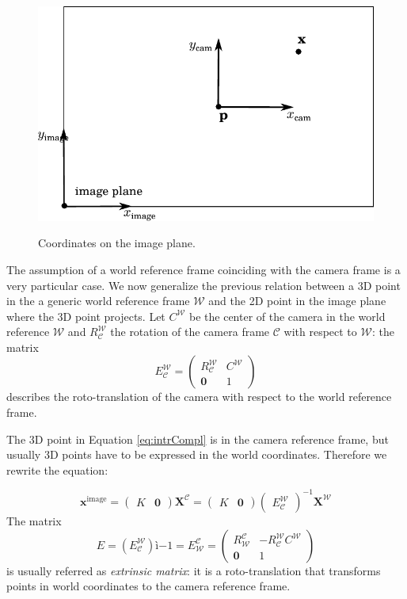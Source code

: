 \begin{figure}[t]
  \includegraphics[width=0.8\columnwidth]{./img/ch-camera/camera02}\\
 \caption{Coordinates on the image plane.}
 \label{fig:centercamera}
\end{figure}
The assumption of a world reference frame coinciding with the camera frame is a very particular case. We now generalize the previous relation between a 3D point in the a generic world reference frame $\mathcal{W}$ and the 2D point in the image plane where the 3D point projects.
Let $C^\mathcal{W}$ be the center of the camera in the world reference $\mathcal{W}$ and  $R_\mathcal{C}^\mathcal{W}$ the rotation of the camera frame $\mathcal{C}$ with respect to $\mathcal{W}$: the matrix 
\begin{equation}
E_\mathcal{C}^\mathcal{W} = 
\begin{pmatrix}
R_\mathcal{C}^\mathcal{W} &C^\mathcal{W}\\
\mathbf{0}&1
 \end{pmatrix}   
\end{equation}
 describes the roto-translation of the camera with respect to the world reference frame.

The 3D point in Equation \ref{eq:intrCompl} is in the camera reference frame, but usually 3D points have to be expressed in the world coordinates. Therefore we rewrite the equation:


\begin{equation}
 \mathbf{x}^{\text{image}} =
\begin{pmatrix}
 K &\mathbf{0}
 \end{pmatrix} 
 \mathbf{X}^\mathcal{C}
 = 
\begin{pmatrix}
 K &\mathbf{0}
 \end{pmatrix} 
\begin{pmatrix}
 E_\mathcal{C}^\mathcal{W}
 \end{pmatrix}^{-1}
 \mathbf{X}^\mathcal{W}
\end{equation}
The matrix 
\begin{equation}
  E = (E_\mathcal{C}^\mathcal{W})ì{-1} = E_\mathcal{W}^\mathcal{C} = 
\begin{pmatrix}
R_\mathcal{W}^\mathcal{C} & - R_\mathcal{C}^\mathcal{W} C^\mathcal{W}\\
\mathbf{0}&1
 \end{pmatrix} 
\end{equation}
is usually referred as \emph{extrinsic matrix}: it is a roto-translation that transforms points in world coordinates to the camera reference frame.

